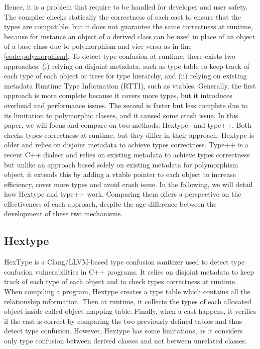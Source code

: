 \documentclass[a4paper,11pt,oneside]{report}
\begin{document}
Hence, it is a problem that require to be handled for developer and user safety.
The compiler checks statically the correctness of each cast to ensure that the
types are compatible, but it does not guarantee the same correctness at runtime, 
because for instance an object of a derived class can be used in place of an
object of a base class due to polymorphism and vice versa as in line
\ref{code:polymorphism}.  To detect type confusion at runtime, there exists two
approaches: (i) relying on disjoint metadata, such as type table to keep track
of each type of each object or trees for type hierarchy, and (ii) relying on
existing metadata Runtime Type Information (RTTI), such as vtables. 
Generally, the first approach is more complete because it covers more types, but
it introduces overhead and performance issues. The second is faster but less
complete due to its limitation to polymorphic classes, and it caused some crash
issue.  In this paper, we will focus and compare on two methods: Hextype~\cite{hextype} and
type++\cite{typepp}.  Both checks types correctness at runtime, but they differ in their
approach. Hextype is older and relies on disjoint metadata to achieve types
correctness.  Type++ is a recent C++ dialect and relies on existing metadata to
achieve types correctness but unlike an approach based solely on existing
metadata for polymorphism object, it extends this by adding a vtable pointer to
each object to increase efficiency, cover more types and avoid crash issue. In
the following, we will detail how Hextype and type++ work.  Comparing them
offers a perspective on the effectiveness of each approach, despite the age
difference between the development of these two mechanisms.

\subsection{Hextype}

HexType is a Clang/LLVM-based type confusion sanitizer used to detect type
confusion vulnerabilities in C++ programs.  It relies on disjoint metadata to
keep track of each type of each object and to check types correctness at
runtime. When compiling a program, Hextype creates a type table which contains
all the relationship information. Then at runtime, it collects the types 
of each allocated object inside called object mapping table. Finally, when a cast happens,
it verifies if the cast is correct by comparing the two previously defined tables and 
thus detect type confusion. However, Hextype has some limitations, as it considers only 
type confusion between derived classes and not between unrelated classes.
\end{document}
